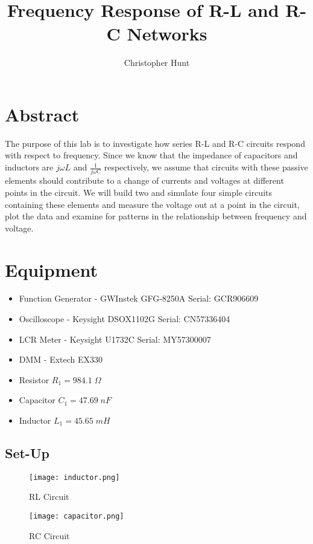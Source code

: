 \documentclass[11pt]{article}
\title{Frequency Response of R-L and R-C Networks}
\author{Christopher Hunt}
\date{}
\begin{document}
\pagestyle{fancy}
\fancyhf{}
\rhead{\thepage}
\maketitle

\section*{Abstract}
The purpose of this lab is to investigate how series R-L and R-C circuits respond with respect to frequency. Since we know that the impedance of capacitors and inductors are $j\omega L$ and $\frac{1}{j\omega C}$ respectively, we assume that circuits with these passive elements should contribute to a change of currents and voltages at different points in the circuit. We will build two and simulate four simple circuits containing these elements and measure the voltage out at a point in the circuit, plot the data and examine for patterns in the relationship between frequency and voltage.
\section*{Equipment}
\begin{itemize}
    \item Function Generator - GWInstek GFG-8250A   Serial: GCR906609
    \item Oscilloscope - Keysight DSOX1102G     Serial: CN57336404
    \item LCR Meter - Keysight U1732C       Serial: MY57300007
    \item DMM - Extech EX330
    \item Resistor   $R_1=984.1\;\Omega$
    \item Capacitor     $C_1=47.69\;nF$
    \item Inductor      $L_1=45.65\;mH$
\end{itemize}
\subsection*{Set-Up}
\begin{figure}[h]
\centering
\begin{minipage}{0.4\textwidth}
  \centering
  \texttt{[image: inductor.png]}
  \caption{RL Circuit}
\end{minipage}
\hfill
\begin{minipage}{0.4\textwidth}
  \centering
  \texttt{[image: capacitor.png]}
  \caption{RC Circuit}
\end{minipage}
\end{figure}
\end{document}
